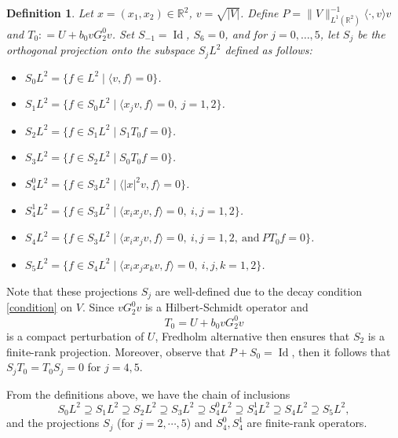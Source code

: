 \documentclass[reqno]{amsart}
\newtheorem{definition}[theorem]{Definition}
\def\Id{\mathop{\mathrm{Id}}\nolimits}
\numberwithin{equation}{section}
\begin{document}
\begin{definition}\label{defS}
	Let $x = (x_1, x_2) \in \mathbb{R}^2$, $v=\sqrt{|V|}$.  Define $P = \|V\|_{L^1(\mathbb{R}^2)}^{-1} \langle \cdot, v\rangle v$ and $T_0 : = U + b_0 v G_2^0 v $. Set  $S_{-1} = \Id$, $S_6 = 0$, and for $j=0,\dots,5$, let $S_j$ be the orthogonal projection onto the subspace $S_jL^2$ defined as follows:
	\begin{itemize}
			\item $S_0L^2 = \{ f \in L^2 \mid \langle  v, f \rangle = 0\}$.
		\item $S_1L^2 = \{ f \in S_0L^2 \mid \langle x_j v, f \rangle = 0,\ j = 1,2 \}$.
		\vskip0.1cm
		\item $S_2L^2 = \{ f \in S_1L^2 \mid S_1T_0f = 0 \}$.
		\vskip0.1cm
		\item $S_3L^2 = \{ f \in S_2L^2 \mid S_0T_0f = 0 \}$.
		\vskip0.1cm
		\item $S_4^0L^2 = \{ f \in S_3L^2 \mid \langle |x|^2 v, f \rangle = 0 \}$.
        \vskip0.1cm
		\item $S_4^1L^2 = \{ f \in S_3L^2 \mid \langle x_ix_j v, f \rangle = 0,\ i,j = 1,2\}$.
		\vskip0.1cm
		\item $S_4L^2 = \{ f \in S_3L^2 \mid \langle x_ix_j v, f \rangle = 0,\ i,j = 1,2,\ \text{and}\ PT_0f = 0 \}$.
		\vskip0.1cm
		\item $S_5L^2 = \{ f \in S_4L^2 \mid \langle x_ix_jx_k v, f \rangle = 0,\ i,j,k = 1,2 \}$.
	\end{itemize}
\end{definition}

Note that these projections $S_j$ are well-defined due to the decay condition \eqref{condition} on $V$.  Since  $vG_2^0 v$ is a Hilbert-Schmidt operator and
$$
 T_0  = U + b_0 v G_2^0 v
$$
is a compact perturbation of $U$,  Fredholm alternative then ensures that $S_2$ is a finite-rank projection. Moreover, observe that $P+S_0=\Id$, then it follows that $S_jT_0=T_0S_j=0$ for $j=4,5.$

From the definitions above, we have the chain of inclusions
\[
S_0 L^2 \supseteq S_1 L^2 \supseteq S_2 L^2 \supseteq S_3 L^2 \supseteq S_4^0 L^2  \supseteq S_4^1 L^2 \supseteq S_4 L^2 \supseteq S_5 L^2,
\]
and the projections $S_j$ (for $j=2,\cdots,5$) and $S_4^0, S_4^1$ are finite-rank operators.
\end{document}

